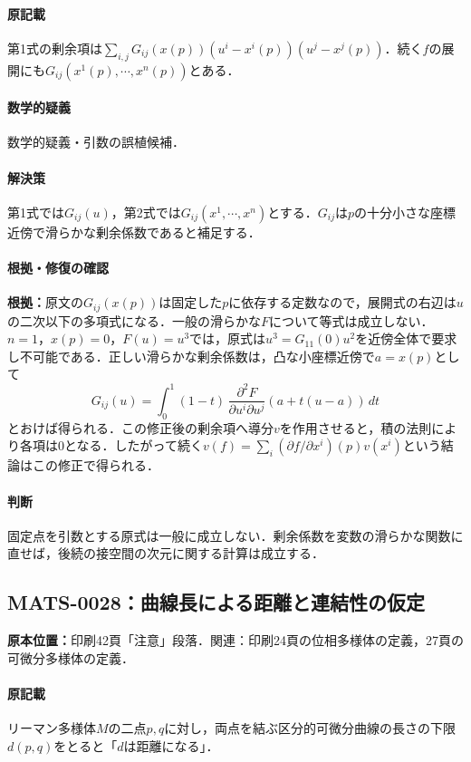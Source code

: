 \documentclass[a4paper,10pt]{ltjsarticle}
\begin{document}
\paragraph{原記載}第1式の剰余項は$\sum_{i,j}G_{ij}(x(p))(u^i-x^i(p))(u^j-x^j(p))$．続く$f$の展開にも$G_{ij}(x^1(p),\cdots,x^n(p))$とある．

\paragraph{数学的疑義}数学的疑義・引数の誤植候補．

\paragraph{解決策}第1式では$G_{ij}(u)$，第2式では$G_{ij}(x^1,\cdots,x^n)$とする．$G_{ij}$は$p$の十分小さな座標近傍で滑らかな剰余係数であると補足する．

\paragraph{根拠・修復の確認}\textbf{根拠：}原文の$G_{ij}(x(p))$は固定した$p$に依存する定数なので，展開式の右辺は$u$の二次以下の多項式になる．一般の滑らかな$F$について等式は成立しない．$n=1$，$x(p)=0$，$F(u)=u^3$では，原式は$u^3=G_{11}(0)u^2$を近傍全体で要求し不可能である．正しい滑らかな剰余係数は，凸な小座標近傍で$a=x(p)$として
\[G_{ij}(u)=\int_0^1(1-t)\,\frac{\partial^2F}{\partial u^i\partial u^j}(a+t(u-a))\,dt\]
とおけば得られる．この修正後の剰余項へ導分$v$を作用させると，積の法則により各項は$0$となる．したがって続く$v(f)=\sum_i(\partial f/\partial x^i)(p)v(x^i)$という結論はこの修正で得られる．

\paragraph{判断}固定点を引数とする原式は一般に成立しない．剰余係数を変数の滑らかな関数に直せば，後続の接空間の次元に関する計算は成立する．


\subsection*{MATS-0028：曲線長による距離と連結性の仮定}\label{math:MATS-0028}
\noindent\textbf{原本位置：}印刷42頁「注意」段落．関連：印刷24頁の位相多様体の定義，27頁の可微分多様体の定義．

\paragraph{原記載}リーマン多様体$M$の二点$p,q$に対し，両点を結ぶ区分的可微分曲線の長さの下限$d(p,q)$をとると「$d$は距離になる」．
\end{document}
